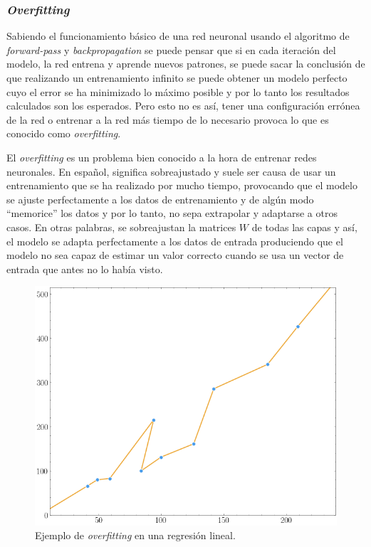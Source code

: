 \subsubsection{\textit{Overfitting}}\label{overfitting}

Sabiendo el funcionamiento básico de una red neuronal usando el algoritmo de \textit{forward-pass} y \textit{backpropagation} se puede pensar que si en cada iteración del modelo, la red entrena y aprende nuevos patrones, se puede sacar la conclusión de que realizando un entrenamiento infinito se puede obtener un modelo perfecto cuyo el error se ha minimizado lo máximo posible y por lo tanto los resultados calculados son los esperados. Pero esto no es así, tener una configuración errónea de la red o entrenar a la red más tiempo de lo necesario provoca lo que es conocido como \textit{overfitting}.
\newline

El \textit{overfitting} es un problema bien conocido a la hora de entrenar redes neuronales. En español, significa sobreajustado y suele ser causa de usar un entrenamiento que se ha realizado por mucho tiempo, provocando que el modelo se ajuste perfectamente a los datos de entrenamiento y de algún modo “memorice” los datos y por lo tanto, no sepa extrapolar y adaptarse a otros casos. En otras palabras, se sobreajustan la matrices $W$ de todas las capas y así, el modelo se adapta perfectamente a los datos de entrada produciendo que el modelo no sea capaz de estimar un valor correcto cuando se usa un vector de entrada que antes no lo había visto.

\begin{figure}[H]
    \centering
    \includegraphics[width=12cm]{images/state-of-art/overfitting/overfitting.png}
    \caption{Ejemplo de \textit{overfitting} en una regresión lineal.}
    \label{fig:basic_network}
\end{figure}

